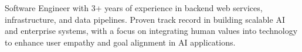 Software Engineer with 3+ years of experience in backend web services, infrastructure, and data pipelines. Proven track record in building scalable AI and enterprise systems, with a focus on integrating human values into technology to enhance user empathy and goal alignment in AI applications.